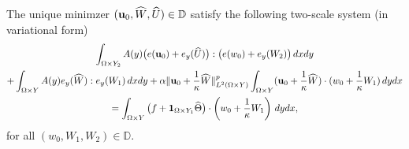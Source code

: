 \documentclass[11pt,a4paper]{article}
\numberwithin{equation}{section}
\def\1{{\bf 1}}
\def\wo{\overline}
\def\O{\Omega}
\def\d{\delta}
\def\e{\varepsilon}
\def\D{{\mathbb{D}}}
\def\ed{{\varepsilon\delta}}
\def\wh{\widehat }
\def\X{\times }
\def\Gm{{\bf m}}
\def\Gu{{\bf u}}
\def\GT{{\bf T}}
\begin{document}

The unique minimzer $(\Gu_0,\wh W,\wh U)\in\D$ satisfy the following two-scale system (in variational form)
\begin{multline}\label{L01}
	\int_{\O\X Y_2} A(y)\big(e(\Gu_0)+e_y(\wh U)\big):\big(e(w_0)+e_y(W_2)\big)\,dx dy\\
	+\int_{\O\X Y}A(y) e_y(\wh W):e_y(W_1)\,dxdy+\alpha\|\Gu_0+{1\over \kappa}\wh W\|^p_{L^2(\O\X Y)}\int_{\O\X Y}(\Gu_0+{1\over \kappa}\wh W)\cdot (w_0+{1\over \kappa}W_1)\,dydx\\
	=\int_{\O\X Y}\big(f+\1_{\O\X Y_1}\wh\Theta\big)\cdot \left(w_0+{1\over \kappa} W_1\right)\,dydx,
\end{multline}
for all $(w_0,W_1,W_2)\in\D$.
\end{document}
